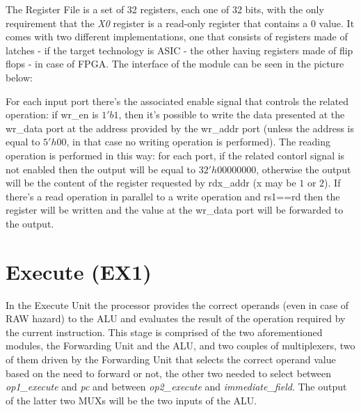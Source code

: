 \documentclass[10pt,  english, makeidx, a4paper, titlepage, oneside]{book}
\begin{document}
The Register File is a set of 32 registers, each one of 32 bits, with the only requirement that the \textit{X0} register is a read-only register that contains a $0$ value. It comes with two different implementations, one that consists of registers made of latches - if the target technology is ASIC - the other having registers made of flip flops - in case of FPGA. \newline
The interface of the module can be seen in the picture below:

For each input port there's the associated enable signal that controls the related operation: if wr\_en is $1'b1$, then it's possible to write the data presented at the wr\_data port at the address provided by the wr\_addr port (unless the address is equal to $5'h00$, in that case no writing operation is performed). The reading operation is performed in this way: for each port, if the related contorl signal is not enabled then the output will be equal to $32'h00000000$, otherwise the output will be the content of the register requested by rdx\_addr (x may be $1$ or $2$). If there's a read operation in parallel to a write operation and rs1==rd then the register will be written and the value at the wr\_data port will be forwarded to the output.

\section{Execute (EX1)}
In the Execute Unit the processor provides the correct operands (even in case of RAW hazard) to the ALU and evaluates the result of the operation required by the current instruction.\newline
This stage is comprised of the two aforementioned modules, the Forwarding Unit and the ALU, and two couples of multiplexers, two of them driven by the Forwarding Unit that selects the correct operand value based on the need to forward or not, the other two needed to select between \textit{op1\_execute} and \textit{pc} and between \textit{op2\_execute} and \textit{immediate\_field}. The output of the latter two MUXs will be the two inputs of the ALU.
\end{document}
